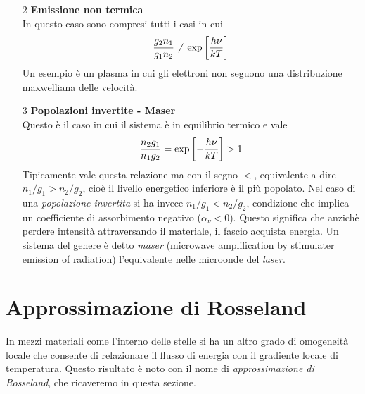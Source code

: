 \begin{itemize}
\item[2]\textbf{Emissione non termica } \\
In questo caso sono compresi tutti i casi in cui
\begin{equation}
\dfrac{g_2n_1}{g_1n_2} \neq \exp\left[ \dfrac{h\nu}{kT} \right] 
\end{equation}
Un esempio è un plasma in cui gli elettroni non seguono una distribuzione maxwelliana delle velocità.
\item[3]\textbf{Popolazioni invertite - Maser } \\
Questo è il caso in cui il sistema è in equilibrio termico e vale
\begin{equation}
\dfrac{n_2g_1}{n_1g_2} =  \exp\left[ -\dfrac{h\nu}{kT} \right]  >1
\end{equation}
Tipicamente vale questa relazione ma con il segno $<$, equivalente a dire $n_1/g_1>n_2/g_2$, cioè il livello energetico inferiore è il più popolato. Nel caso di una \textit{popolazione invertita} si ha invece $n_1/g_1<n_2/g_2$, condizione che implica un coefficiente di assorbimento negativo ($\alpha_\nu<0$). Questo significa che anzichè perdere intensità attraversando il materiale, il fascio acquista energia. Un sistema del genere è detto \textit{maser} (microwave amplification by stimulater emission of radiation) l'equivalente nelle microonde del \textit{laser}. 
\end{itemize}

\section{Approssimazione di Rosseland}
In mezzi materiali come l'interno delle stelle si ha un altro grado di omogeneità locale che consente di relazionare il flusso di energia con il gradiente locale di temperatura. Questo risultato è noto con il nome di \textit{approssimazione di Rosseland}, che ricaveremo in questa sezione.

